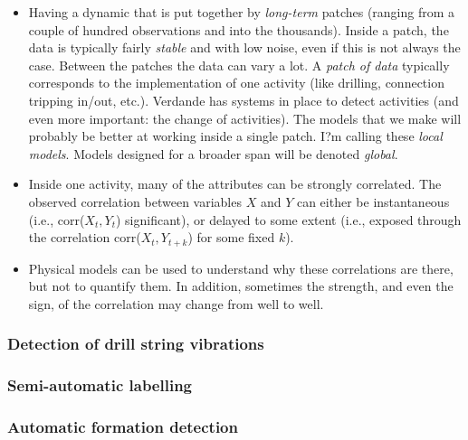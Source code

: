 \begin{itemize}

\item Having a dynamic that is put together by \emph{long-term} patches (ranging from a couple of hundred observations and into the thousands). Inside a patch, the data is typically fairly \emph{stable} and with low noise, even if this is not always the case. Between the patches the data can vary a lot. A \emph{patch of data} typically corresponds to the implementation of one activity (like drilling, connection tripping in/out, etc.). Verdande has systems in place to detect activities (and even more important: the change of activities). The models that we make will probably be better at working inside a single patch. I?m calling these \emph{local models}. Models designed for a broader span will be denoted \emph{global}.

\item Inside one activity, many of the attributes can be strongly correlated. The observed correlation between variables $X$ and $Y$ can either be instantaneous (i.e., corr($X_t, Y_t$) significant), or delayed to some extent (i.e., exposed through the correlation corr($X_t, Y_{t+k}$) for some fixed $k$).

\item Physical models can be used to understand why these correlations are there, but not to quantify them. In addition, sometimes the strength, and even the sign, of the correlation may change from well to well.

\end{itemize}


\subsubsection{Detection of drill string vibrations}


\subsubsection{Semi-automatic labelling}


\subsubsection{Automatic formation detection}


